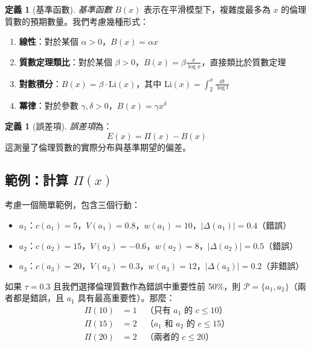 \documentclass[12pt,a4paper]{article}
\theoremstyle{definition}
\newtheorem{definition}[theorem]{定義}
\theoremstyle{remark}
\begin{document}
\begin{definition}[基準函數]
\emph{基準函數} $B(x)$ 表示在平滑模型下，複雜度最多為 $x$ 的倫理質數的預期數量。我們考慮幾種形式：
\begin{enumerate}
    \item \textbf{線性}：對於某個 $\alpha > 0$，$B(x) = \alpha x$
    \item \textbf{質數定理類比}：對於某個 $\beta > 0$，$B(x) = \beta \frac{x}{\log x}$，直接類比於質數定理
    \item \textbf{對數積分}：$B(x) = \beta \cdot \text{Li}(x)$，其中 $\text{Li}(x) = \int_2^x \frac{dt}{\log t}$
    \item \textbf{冪律}：對於參數 $\gamma, \delta > 0$，$B(x) = \gamma x^\delta$
\end{enumerate}
\end{definition}

\begin{definition}[誤差項]
\emph{誤差項}為：
\[
E(x) = \Pi(x) - B(x)
\]
這測量了倫理質數的實際分布與基準期望的偏差。
\end{definition}

\subsection{範例：計算 \texorpdfstring{$\Pi(x)$}{Pi(x)}}

考慮一個簡單範例，包含三個行動：
\begin{itemize}
    \item $a_1$：$c(a_1) = 5$，$V(a_1) = 0.8$，$w(a_1) = 10$，$|\Delta(a_1)| = 0.4$（錯誤）
    \item $a_2$：$c(a_2) = 15$，$V(a_2) = -0.6$，$w(a_2) = 8$，$|\Delta(a_2)| = 0.5$（錯誤）
    \item $a_3$：$c(a_3) = 20$，$V(a_3) = 0.3$，$w(a_3) = 12$，$|\Delta(a_3)| = 0.2$（非錯誤）
\end{itemize}

如果 $\tau = 0.3$ 且我們選擇倫理質數作為錯誤中重要性前 50\%，則 $\mathcal{P} = \{a_1, a_2\}$（兩者都是錯誤，且 $a_1$ 具有最高重要性）。那麼：
\begin{align*}
\Pi(10) &= 1 \quad \text{（只有 $a_1$ 的 $c \leq 10$）} \\
\Pi(15) &= 2 \quad \text{（$a_1$ 和 $a_2$ 的 $c \leq 15$）} \\
\Pi(20) &= 2 \quad \text{（兩者的 $c \leq 20$）}
\end{align*}

\end{document}
